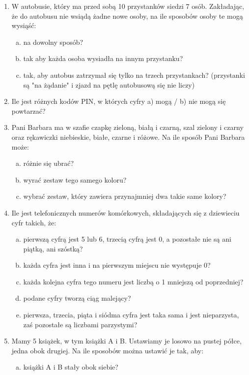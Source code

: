 \documentclass[12pt,a4paper]{article}
\begin{document}
\begin{enumerate}[1.]
\begin{enumerate}[a)]
	\end{enumerate}
\newpage
	\item W autobusie, który ma przed sobą 10 przystanków siedzi 7 osób. Zakładając, że do autobusu nie wsiądą żadne nowe osoby, na ile sposobów osoby te mogą wysiąść:
	\begin{enumerate}[a)]
		\item na dowolny sposób?
		\item tak aby każda osoba wysiadła na innym przystanku?
		\item tak, aby autobus zatrzymał się tylko na trzech przystankach? (przystanki są "na żądanie" i zjazd na pętlę autobusową się nie liczy)
	\end{enumerate}
	\item Ile jest różnych kodów PIN, w których cyfry a) mogą / b) nie mogą się powtarzać?
	\item Pani Barbara ma w szafie czapkę zieloną, białą i czarną, szal zielony i czarny oraz rękawiczki niebieskie, białe, czarne i różowe. Na ile sposób Pani Barbara może:
	\begin{enumerate}[a)]
		\item różnie się ubrać?
		\item wyrać zestaw tego samego koloru?
		\item wybrać zestaw, który zawiera przynajmniej dwa takie same kolory?
	\end{enumerate}
	\item Ile jest telefonicznych numerów komórkowych, składających się z dziewieciu cyfr takich, że:
	\begin{enumerate}[a)]
		\item pierwszą cyfrą jest 5 lub 6, trzecią cyfrą jest 0, a pozostałe nie są ani piątką, ani szóstką?
		\item każda cyfra jest inna i na pierwszym miejscu nie występuje 0?
		\item każda kolejna cyfra tego numeru jest liczbą o 1 mniejszą od poprzedniej?
		\item podane cyfry tworzą ciąg malejący?
		\item pierwsza, trzecia, piąta i siódma cyfra jest taka sama i jest nieparzysta, zaś pozostałe są liczbami parzystymi?
	\end{enumerate}
	\item Mamy 5 książek, w tym książki A i B. Ustawiamy je losowo na pustej półce, jedna obok drugiej. Na ile sposobów można ustawić je tak, aby:
	\begin{enumerate}[a)]
		\item książki A i B stały obok siebie?

\end{enumerate}
\end{enumerate}
\end{document}
